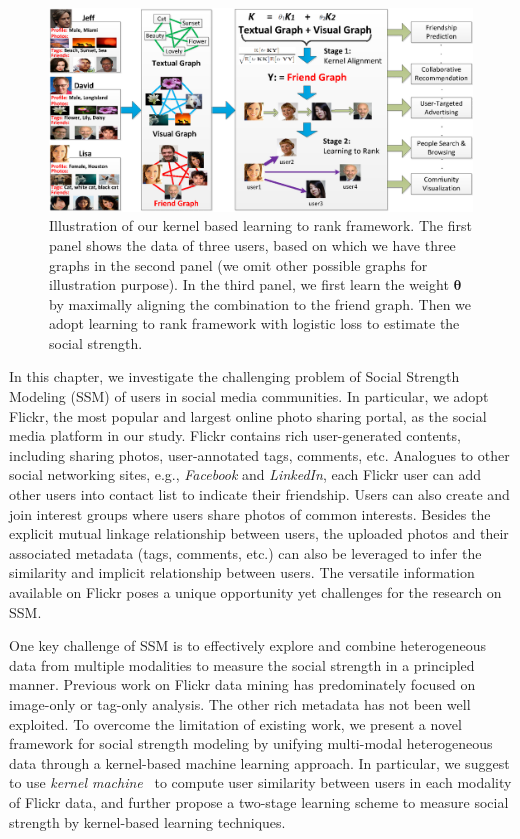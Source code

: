 \begin{figure}[!t]
\includegraphics[width=\linewidth]{figures/mm_framework.eps}
\caption{Illustration of our kernel based learning to rank framework. The first panel shows the data of three users, based on which we have three graphs in the
second panel (we omit other possible graphs for illustration purpose). In the third panel, we first learn the weight $\bm\theta$ by maximally aligning the
combination to the friend graph. Then we adopt learning to rank framework with logistic loss to estimate the social strength.}
\end{figure}

In this chapter, we investigate the challenging problem of Social Strength Modeling (SSM) of users in social media communities. In particular, we adopt Flickr,
the most popular and largest online photo sharing portal, as the social media platform in our study. Flickr contains rich user-generated contents, including
sharing photos, user-annotated tags, comments, etc. Analogues to other social networking sites, e.g., {\em Facebook} and {\em LinkedIn}, each Flickr user can
add other users into contact list to indicate their friendship. Users can also create and join interest groups where users share photos of common interests.
Besides the explicit mutual linkage relationship between users, the uploaded photos and their associated metadata (tags, comments, etc.) can also be leveraged to infer the similarity and implicit relationship between users. The versatile information available on Flickr poses a unique opportunity yet challenges for the research on SSM.

One key challenge of SSM is to effectively explore and combine heterogeneous data from multiple modalities to measure the social strength in a principled
manner. Previous work on Flickr data mining has predominately focused on image-only or tag-only analysis. The other rich metadata has not been well exploited. To overcome the limitation of existing work, we present a novel framework for social strength modeling by unifying multi-modal heterogeneous data through a kernel-based machine learning approach. In particular, we suggest to use {\it kernel machine}~\cite{ml/CortesV95} to compute user similarity between users in each modality of Flickr data, and further propose a two-stage learning scheme to measure social strength by kernel-based learning techniques.

